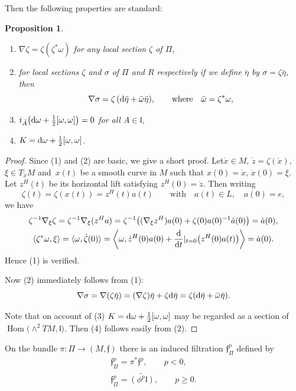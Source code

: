 \documentclass[pdftex]{sigma}%
\newcommand{\f}{\mathfrak f}
\newcommand{\lf}{\mathfrak l}
\newcommand{\Hom}{\operatorname{Hom}}
\newtheorem{prop}[thm]{Proposition}
\numberwithin{equation}{section}
\begin{document}
Then the following properties are standard:
\begin{prop}\label{stProp}\quad
\begin{enumerate}\itemsep=0pt
\item[$(1)$] $\nabla \zeta = \zeta (\zeta^*\omega)$ for any local section $\zeta$ of $\Pi$,
\item[$(2)$] for local sections $\zeta$ and $\sigma$ of $\Pi$ and $R$ respectively if we define $\bar\eta$ by $\sigma = \zeta\bar\eta$, then
\[
\nabla \sigma = \zeta \left({\rm d}\bar\eta +\bar\omega\bar\eta\right)\!,\qquad\text{where} \quad\bar\omega=\zeta^*\omega,
\]
\item[$(3)$] $i_{\tilde A}\big({\rm d}\omega + \tfrac{1}{2}[\omega,\omega]\big)=0$ for all $A\in\lf$,
\item[$(4)$] $K = {\rm d}\omega + \tfrac{1}{2}[\omega,\omega]$.
\end{enumerate}
\end{prop}
\begin{proof}
	Since (1) and (2) are basic, we give a short proof. Let$\mathring{x}\in M$, $\mathring{z}=\zeta(\mathring{x})$, $\xi\in T_{\mathring{x}}M$ and~$x(t)$ be a smooth curve in $M$ such that $x(0)=\mathring{x}$, $\dot x(0)=\xi$. Let $z^H(t)$ be its horizontal lift satisfying $z^H(0)=\mathring{z}$. Then writing
\[
\zeta(t) = \zeta(x(t)) = z^H(t) a(t)\qquad\text{with}\quad a(t)\in L,\quad a(0)=e,
\]
we have
\begin{gather*}
\zeta^{-1}\nabla_{\xi}\zeta =\zeta^{-1}\nabla_{\xi}(z^Ha)
= \zeta^{-1}\big((\nabla_\xi z^H)a(0)+\zeta(0)a(0)^{-1}\dot a(0)\big)=\dot a(0),
\\
\langle \zeta^*\omega, \xi\rangle = \langle \omega, \dot\zeta(0)\rangle
= \bigg\langle \omega, \dot z^H(0)a(0)+\frac{\rm d}{{\rm d}t}|_{t=0}\big(z^H(0)a(t)\big)\bigg\rangle = \dot a(0).
\end{gather*}
Hence (1) is verified.
	
	Now (2) immediately follows from (1):
	\[
		\nabla \sigma = \nabla (\zeta\bar\eta) = (\nabla\zeta) \bar\eta +\zeta {\rm d}\bar\eta = \zeta({\rm d}\bar\eta+\bar\omega\bar\eta).
	\]
	
	Note that on account of (3) $K={\rm d}\omega+\tfrac{1}{2}[\omega,\omega]$ may be regarded as a section of $\Hom\big({\wedge}^2 TM,\lf\big)$. Then (4) follows easily from (2).
	\end{proof}
	
	On the bundle $\pi\colon \Pi\to (M,\f)$ there is an induced filtration $\f^p_{\Pi}$ defined by
	\begin{gather*}
		\f^p_{\Pi} = \pi^*\f^p,\qquad p<0, \\
		\f^p_{\Pi} = \widetilde{(\phi^p\lf)},\qquad p\ge 0.
	\end{gather*}
	
\end{document}

